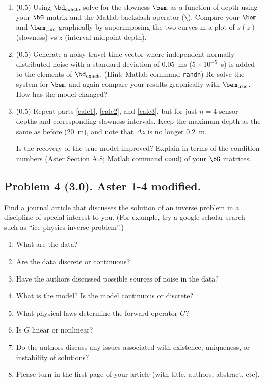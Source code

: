 \documentclass[11pt,titlepage,fleqn]{article}
\begin{document}
\begin{enumerate}
\label{calc1}


\item (0.5) Using $\bd_{\rm exact}$, solve for the slowness $\bem$ as a function of depth using your $\bG$ matrix and the Matlab backslash operator (\verb+\+). Compare your $\bem$ and $\bem_{\rm true}$  graphically by superimposing the two curves in a plot of $s(z)$ (slowness) vs $z$ (interval midpoint depth).

\label{calc2}


\item (0.5) Generate a noisy travel time vector where independent normally distributed noise with a standard deviation of 0.05~ms ($5 \times 10^{-5}$~s) is added to the elements of $\bd_{\rm exact}$. (Hint: Matlab command \verb+randn+) Re-solve the system for $\bem$ and again compare your results graphically with $\bem_{\rm true}$. How has the model changed?


\label{calc3}


\item (0.5) Repeat parts \ref{calc1}, \ref{calc2}, and \ref{calc3}, but for just $n=4$ sensor depths and corresponding slowness intervals. Keep the maximum depth as the same as before (20~m), and note that $\Delta z$ is no longer 0.2~m.

Is the recovery of the true model improved? Explain in terms of the condition numbers (Aster Section A.8; Matlab command \verb+cond+) of your $\bG$ matrices.

\end{enumerate}


\subsection*{Problem 4 (3.0). Aster 1-4 modified.}

Find a journal article that discusses the solution of an inverse problem in a discipline of special interest to you. (For example, try a google scholar search such as ``ice physics inverse problem''.)
%
\begin{enumerate}
\item What are the data?
\item Are the data discrete or continuous?
\item Have the authors discussed possible sources of noise in the data?
\item What is the model? Is the model continuous or discrete?
\item What physical laws determine the forward operator $G$?
\item Is $G$ linear or nonlinear?
\item Do the authors discuss any issues associated with existence, uniqueness, or instability of solutions?
\item Please turn in the first page of your article (with title, authors, abstract, etc).
\end{enumerate}
\end{document}
